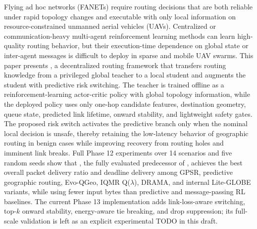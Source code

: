 Flying ad hoc networks (FANETs) require routing decisions that are both reliable under rapid topology changes and executable with only local information on resource-constrained unmanned aerial vehicles (UAVs). Centralized or communication-heavy multi-agent reinforcement learning methods can learn high-quality routing behavior, but their execution-time dependence on global state or inter-agent messages is difficult to deploy in sparse and mobile UAV swarms. This paper presents \method, a decentralized routing framework that transfers routing knowledge from a privileged global teacher to a local student and augments the student with predictive risk switching. The teacher is trained offline as a reinforcement-learning actor-critic policy with global topology information, while the deployed policy uses only one-hop candidate features, destination geometry, queue state, predicted link lifetime, onward stability, and lightweight safety gates. The proposed risk switch activates the predictive branch only when the nominal local decision is unsafe, thereby retaining the low-latency behavior of geographic routing in benign cases while improving recovery from routing holes and imminent link breaks. Full Phase 12 experiments over 14 scenarios and five random seeds show that \phaseTwelve, the fully evaluated predecessor of \method, achieves the best overall packet delivery ratio and deadline delivery among GPSR, predictive geographic routing, Evo-QGeo, IQMR Q($\lambda$), DRAMA, and internal Lite-GLOBE variants, while using fewer input bytes than predictive and message-passing RL baselines. The current Phase 13 \method{} implementation adds link-loss-aware switching, top-$k$ onward stability, energy-aware tie breaking, and drop suppression; its full-scale validation is left as an explicit experimental TODO in this draft.
